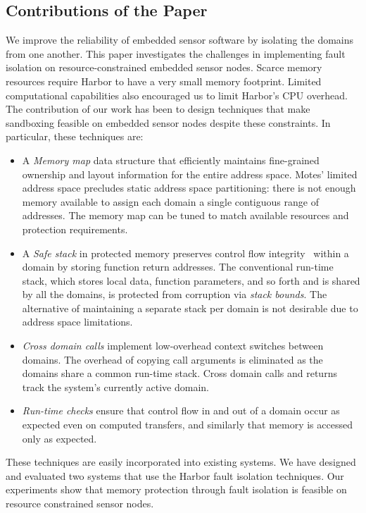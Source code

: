 \subsection{Contributions of the Paper}
%
We improve the reliability of embedded sensor software by isolating
the domains from one another.
%
This paper investigates the challenges in implementing fault isolation
on resource-constrained embedded sensor nodes.
%
Scarce memory resources require Harbor to have a very small memory
footprint.
%
Limited computational capabilities also encouraged us to limit Harbor's
CPU overhead.
%
The contribution of our work has been to design techniques that make
sandboxing feasible on embedded sensor nodes despite these
constraints.
%
In particular, these techniques are:
%
\begin{itemize}
%
\item{A \emph{Memory map} data structure that efficiently maintains
fine-grained ownership and layout information for the entire address
space.
%
Motes' limited address space precludes static address space
partitioning: there is not enough memory available to assign each
domain a single contiguous range of addresses.
%
The memory map can be tuned to match available resources and protection
requirements.
%
}
%
\item{A \textit{Safe stack} in protected memory preserves control flow
integrity~\cite{xfi06osdi} within a domain by storing function return addresses.
%
The conventional run-time stack, which stores local data, function
parameters, and so forth and is shared by all the domains, is
protected from corruption via \emph{stack bounds}.
%
The alternative of maintaining a separate stack per
domain is not desirable due to address space limitations.
%
}
%
\item{\textit{Cross domain calls} implement low-overhead
context switches between domains.
%
The overhead of copying call arguments is eliminated as the domains
share a common run-time stack.
%
Cross domain calls and returns track the system's currently active domain.
%
}
%
\item{\textit{Run-time checks} ensure that control flow in and out
of a domain occur as expected even on computed transfers, and
similarly that memory is accessed only as expected.
%
}
%
\end{itemize}

%
These techniques are easily incorporated into existing systems.
%
We have designed and evaluated two systems that use the Harbor fault isolation
techniques.
%
Our experiments show that memory protection through fault isolation is
feasible on resource constrained sensor nodes.

